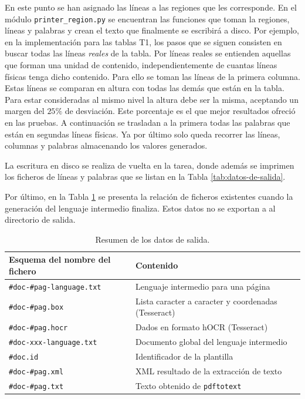 En este punto se han asignado las líneas a las regiones que les corresponde. En el módulo \verb|printer_region.py| se encuentran las funciones que toman la regiones, líneas y palabras y crean el texto que finalmente se escribirá a disco. Por ejemplo, en la implementación para las tablas T1, los pasos que se siguen consisten en buscar todas las líneas \emph{reales} de la tabla. Por líneas reales se entienden aquellas que forman una unidad de contenido, independientemente de cuantas líneas físicas tenga dicho contenido. Para ello se toman las líneas de la primera columna. Estas líneas se comparan en altura con todas las demás que están en la tabla. Para estar consideradas al mismo nivel la altura debe ser la misma, aceptando un margen del $ 25\% $ de desviación. Este porcentaje es el que mejor resultados ofreció en las pruebas. A continuación se trasladan a la primera todas las palabras que están en segundas líneas físicas. Ya por último solo queda recorrer las líneas, columnas y palabras almacenando los valores generados.

La escritura en disco se realiza de vuelta en la tarea, donde además se imprimen los ficheros de líneas y palabras que se listan en la Tabla \ref{tab:datos-de-salida}.


Por último, en la Tabla \ref{tab:datos-intermedios} se presenta la relación de ficheros existentes cuando la generación del lenguaje intermedio finaliza. Estos datos no se exportan a al directorio de salida.

\begin{table}[ht]
    \centering
    \begin{tabular}{l l}
        Esquema del nombre del fichero & Contenido \\
        \hline
        \hline
        \verb|#doc-#pag-language.txt| & Lenguaje intermedio para una página \\
        \verb|#doc-#pag.box| & Lista caracter a caracter y coordenadas (Tesseract) \\
        \verb|#doc-#pag.hocr| & Dados en formato hOCR (Tesseract) \\
        \verb|#doc-xxx-language.txt| & Documento global del lenguaje intermedio \\
        \verb|#doc.id| & Identificador de la plantilla \\
        \verb|#doc-#pag.xml| & XML resultado de la extracción de texto \\
        \verb|#doc-#pag.txt| & Texto obtenido de \verb|pdftotext| \\
    \end{tabular}
    \caption{Resumen de los datos de salida.}    
    \label{tab:datos-intermedios}
\end{table}

